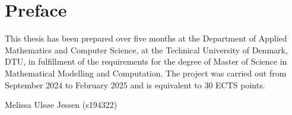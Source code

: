 \chapter*{Preface}
This thesis has been prepared over five months at the Department of Applied Mathematics and Computer Science, at the Technical University of Denmark, DTU, in fulfillment of the requirements for the degree of Master of Science in Mathematical Modelling and Computation.
The project was carried out from September 2024 to February 2025 and is equivalent to 30 ECTS points.

\vfill

\begin{center}
    
    Melissa Ulsøe Jessen (s194322)
\end{center}

\vfill

